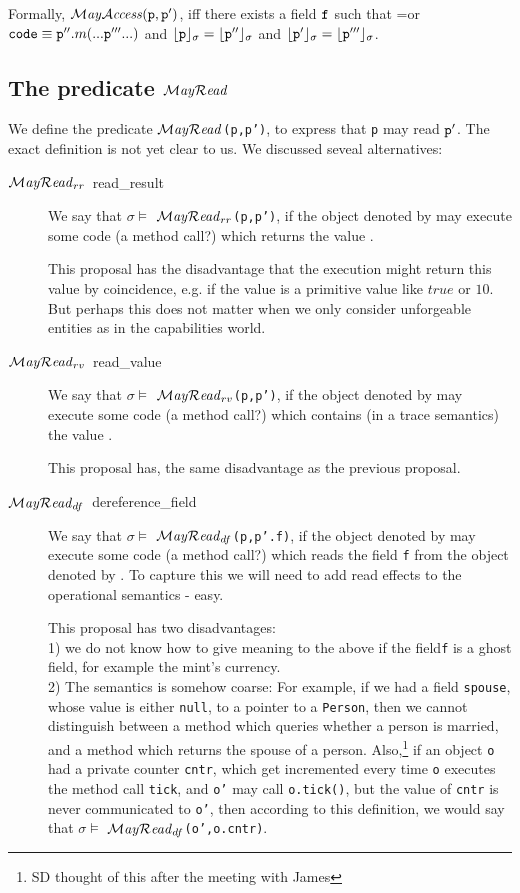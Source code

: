 \documentclass{llncs}
\newcommand{\prg}[1]{{\mbox{\tt{#1}}}}
\begin{document}
Formally, $\MayAccess(\p,\p')$, iff there exists a field $\prg{f}$ such that \interp{\p.\prg{f}}{\sigma}=or $\prg{code}\equiv \p''.m(...\p'''...)$ and $\interp{\p}{\sigma}=\interp{\p''}{\sigma}$ and $\interp{\p'}{\sigma}=\interp{\p'''}{\sigma}$.



\subsection{The predicate $\mathcal{M}\textrm{\textit{ay}}{\mathcal{R}}\textrm{\textit{ead}}$}

We define the predicate \prg{$\mathcal{M}\textrm{\textit{ay}}{\mathcal{R}}\textrm{\textit{ead}}$(p,p')}, to express that 
\prg{p} may read   $\prg{p}'$. 
The exact definition is not yet clear to us. 
We discussed seveal alternatives:

\begin{description}
\item[$\mathcal{M}\textrm{\textit{ay}}{\mathcal{R}}\textrm{\textit{ead}}_{rr}$\ read\_result]  We say that $\sigma \models$ \prg{$\mathcal{M}\textrm{\textit{ay}}{\mathcal{R}}\textrm{\textit{ead}}_{rr}$(p,p')}, if the object denoted by  may execute some code (a method call?) which returns the value    .

This proposal has the disadvantage that the execution might return this value  by coincidence, e.g. if the value is a primitive value like $true$ or $10$. But perhaps this does not matter when we only consider unforgeable entities as in the capabilities world. 


\item[$\mathcal{M}\textrm{\textit{ay}}{\mathcal{R}}\textrm{\textit{ead}}_{rv}$\ read\_value]  We say that $\sigma \models$ \prg{$\mathcal{M}\textrm{\textit{ay}}{\mathcal{R}}\textrm{\textit{ead}}_{rv}$(p,p')}, if the object denoted by  may execute some code (a method call?) which contains (in a trace semantics) the value    .

This proposal has,  the same disadvantage as the previous proposal.

\item[$\mathcal{M}\textrm{\textit{ay}}{\mathcal{R}}\textrm{\textit{ead}}_{df}$\ dereference\_field]  We say that $\sigma \models$ \prg{$\mathcal{M}\textrm{\textit{ay}}{\mathcal{R}}\textrm{\textit{ead}}_{df}$(p,p'.f)}, 
if  the object denoted by  may execute some code (a method call?) 
which reads the field \prg{f} from the object  denoted by  . To capture this we will
need to add   read effects to the operational semantics - easy.

This proposal has two disadvantages: \\
1) we do not know how to give meaning to
the above if the field\prg{f} is a ghost field, for example the mint's currency. \\
 2) The semantics is somehow coarse:
For example, if we had a field \prg{spouse}, whose value is either \prg{null}, to
a pointer to a \prg{Person}, then we cannot distinguish between a method which 
queries whether a person is married, and a method which returns the spouse 
of a person. Also,\footnote{SD thought of this after the meeting with James} 
if  an object \prg{o} had a private counter \prg{cntr}, which get incremented 
every time \prg{o} executes the method call \prg{tick}, and \prg{o'} may call \prg{o.tick()},
but the value of \prg{cntr} is never communicated to \prg{o'}, then 
according to this definition, we would say that   $\sigma \models$ \prg{$\mathcal{M}\textrm{\textit{ay}}{\mathcal{R}}\textrm{\textit{ead}}_{df}$(o',o.cntr)}.


\end{description}
\end{document}
